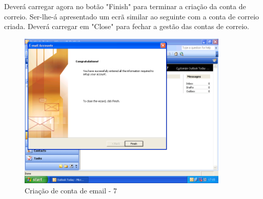 Deverá carregar agora no botão "Finish" para terminar a criação da conta de correio.
Ser-lhe-á apresentado um ecrã similar ao seguinte com a conta de correio criada. Deverá carregar em "Close" para fechar a gestão das contas de correio.

\begin{figure}[H]
    \begin{center}
        \includegraphics[width=10cm]{include/img/outlook2003_7}
    \end{center}
    \caption{Criação de conta de email - 7}
    \label{fig:OUTLK2k39}
\end{figure}


